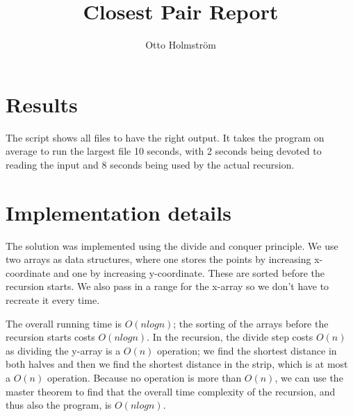 \documentclass{article}
\title{Closest Pair Report}
\author{Otto Holmström}
\begin{document}
  \maketitle

  \section{Results}

The script shows all files to have the right output. It takes the program on average to run the largest file 10 seconds, with 2 seconds being devoted to reading the input and 8 seconds being used by the actual recursion.


  \section{Implementation details}


The solution was implemented using the divide and conquer principle. We use two arrays as data structures, where one stores the points by increasing x-coordinate and one by increasing y-coordinate. These are sorted before the recursion starts. We also pass in a range for the x-array so we don't have to recreate it every time.

The overall running time is $O(n log n)$; the sorting of the arrays before the recursion starts costs $O(n log n)$. In the recursion, the divide step costs $O(n)$ as dividing the y-array is a $O(n)$ operation; we find the shortest distance in both halves and then we find the shortest distance in the strip, which is at most a $O(n)$ operation. Because no operation is more than $O(n)$, we can use the master theorem to find that the overall time complexity of the recursion, and thus also the program, is $O (n log n)$.
\end{document}
